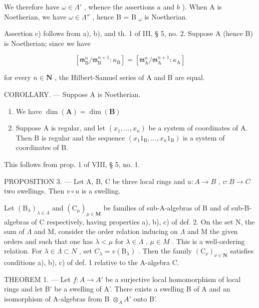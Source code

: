 We therefore have \(\omega\in\Lambda'\) , whence the assertions \(a\) and \(b\) ). When A is Noetherian, we have \(\omega\in\Lambda''\) , hence B = B \(_{\omega}\) is Noetherian.

Assertion c) follows from a), b), and th. 1 of III, § 5, no. 2. Suppose A (hence B) is Noetherian; since we have

\[
\left[ \mathfrak {m} _ {\mathrm{B}} ^ {n} / \mathfrak {m} _ {\mathrm{B}} ^ {n + 1}: \kappa_ {\mathrm{B}} \right] = \left[ \mathfrak {m} _ {\mathrm{A}} ^ {n} / \mathfrak {m} _ {\mathrm{A}} ^ {n + 1}: \kappa_ {\mathrm{A}} \right]
\]

for every \(n \in \mathbf{N}\) , the Hilbert-Samuel series of A and B are equal.

COROLLARY. --- Suppose A is Noetherian.

\begin{enumerate}
\def\labelenumi{\alph{enumi})}
\item
  We have \(\dim (\mathbf{A}) = \dim (\mathbf{B})\)
\item
  Suppose A is regular, and let \((x_{1},\ldots ,x_{n})\) be a system of coordinates of A. Then B is regular and the sequence \((x_{1}1_{\mathrm{B}},\dots,x_{n}1_{\mathrm{B}})\) is a system of coordinates of B.
\end{enumerate}

This follows from prop. 1 of VIII, § 5, no. 1.

PROPOSITION 3. --- Let A, B, C be three local rings and \(u:A\to B\) , \(v:B\to C\) two swellings. Then \(v\circ u\) is a swelling.

Let \((\mathrm{B}_{\lambda})_{\lambda\in\Lambda}\) and \((\mathrm{C}_{\mu})_{\mu\in\mathbf{M}}\) be families of sub-A-algebras of B and of sub-B-algebras of C respectively, having properties a), b), c) of def. 2. On the set N, the sum of \(\Lambda\) and M, consider the order relation inducing on \(\Lambda\) and M the given orders and such that one has \(\lambda<\mu\) for \(\lambda\in\Lambda\) , \(\mu\in M\) . This is a well-ordering relation. For \(\lambda\in\Lambda\subset N\) , set \(C_{\lambda}=v(\mathrm{B}_{\lambda})\) . Then the family \((\mathrm{C}_{\nu})_{\nu\in\mathbf{N}}\) satisfies conditions a), b), c) of def. 1 relative to the A-algebra C.

THEOREM 1. --- Let \(f:A\to A'\) be a surjective local homomorphism of local rings and let B' be a swelling of A'. There exists a swelling B of A and an isomorphism of A-algebras from B \(\otimes_{A}A'\) onto B'.

